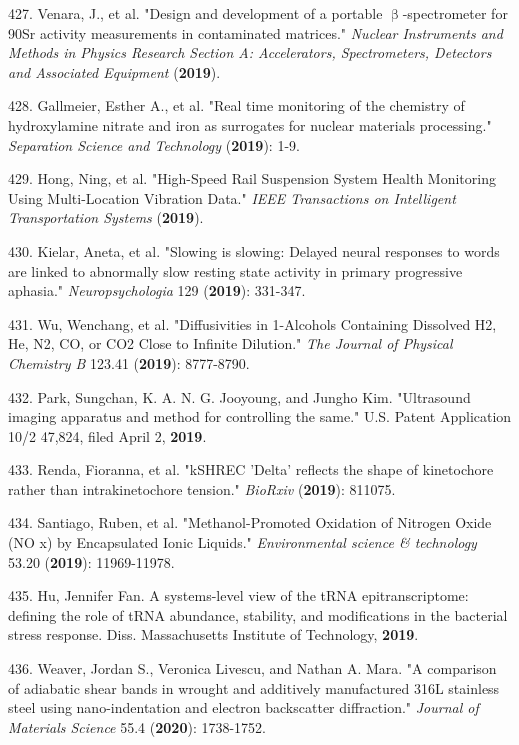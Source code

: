 427. Venara, J., et al. "Design and development of a portable ${\upbeta}$-spectrometer for 90Sr activity measurements in contaminated matrices." \textit{Nuclear Instruments and Methods in Physics Research Section A: Accelerators, Spectrometers, Detectors and Associated Equipment} (\textbf{2019}).

428. Gallmeier, Esther A., et al. "Real time monitoring of the chemistry of hydroxylamine nitrate and iron as surrogates for nuclear materials processing." \textit{Separation Science and Technology} (\textbf{2019}): 1-9.

429. Hong, Ning, et al. "High-Speed Rail Suspension System Health Monitoring Using Multi-Location Vibration Data." \textit{IEEE Transactions on Intelligent Transportation Systems} (\textbf{2019}).

430. Kielar, Aneta, et al. "Slowing is slowing: Delayed neural responses to words are linked to abnormally slow resting state activity in primary progressive aphasia." \textit{Neuropsychologia} 129 (\textbf{2019}): 331-347.

431. Wu, Wenchang, et al. "Diffusivities in 1-Alcohols Containing Dissolved H2, He, N2, CO, or CO2 Close to Infinite Dilution." \textit{The Journal of Physical Chemistry B} 123.41 (\textbf{2019}): 8777-8790.

432. Park, Sungchan, K. A. N. G. Jooyoung, and Jungho Kim. "Ultrasound imaging apparatus and method for controlling the same." U.S. Patent Application 10/2 47,824, filed April 2, \textbf{2019}.

433. Renda, Fioranna, et al. "kSHREC 'Delta' reflects the shape of kinetochore rather than intrakinetochore tension." \textit{BioRxiv} (\textbf{2019}): 811075.

434. Santiago, Ruben, et al. "Methanol-Promoted Oxidation of Nitrogen Oxide (NO x) by Encapsulated Ionic Liquids." \textit{Environmental science \& technology} 53.20 (\textbf{2019}): 11969-11978.

435. Hu, Jennifer Fan. A systems-level view of the tRNA epitranscriptome: defining the role of tRNA abundance, stability, and modifications in the bacterial stress response. Diss. Massachusetts Institute of Technology, \textbf{2019}.

436. Weaver, Jordan S., Veronica Livescu, and Nathan A. Mara. "A comparison of adiabatic shear bands in wrought and additively manufactured 316L stainless steel using nano-indentation and electron backscatter diffraction." \textit{Journal of Materials Science} 55.4 (\textbf{2020}): 1738-1752.

